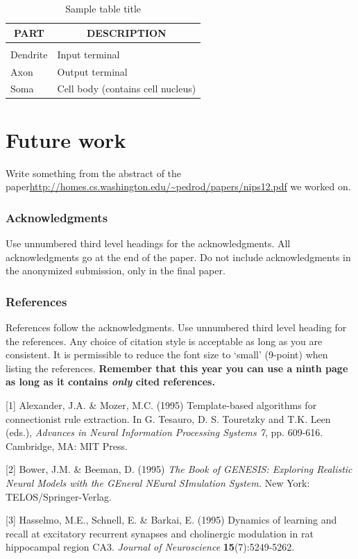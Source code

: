 \documentclass{article} %
\begin{document}
\begin{table}[t]
    \caption{Sample table title}
    \begin{center}
        \begin{tabular}{ll}
        \multicolumn{1}{c}{\bf PART}  &\multicolumn{1}{c}{\bf DESCRIPTION}
        \\ \hline \\
        Dendrite         &Input terminal \\
        Axon             &Output terminal \\
        Soma             &Cell body (contains cell nucleus) \\
        \end{tabular}
    \end{center}
\end{table}

\section{Future work}
    Write something from the abstract of the paper\url{http://homes.cs.washington.edu/~pedrod/papers/nips12.pdf} we worked on.

\subsubsection*{Acknowledgments}

Use unnumbered third level headings for the acknowledgments. All
acknowledgments go at the end of the paper. Do not include 
acknowledgments in the anonymized submission, only in the 
final paper. 

\subsubsection*{References}

References follow the acknowledgments. Use unnumbered third level heading for
the references. Any choice of citation style is acceptable as long as you are
consistent. It is permissible to reduce the font size to `small' (9-point) 
when listing the references. {\bf Remember that this year you can use
a ninth page as long as it contains \emph{only} cited references.}

\small{
[1] Alexander, J.A. \& Mozer, M.C. (1995) Template-based algorithms
for connectionist rule extraction. In G. Tesauro, D. S. Touretzky
and T.K. Leen (eds.), {\it Advances in Neural Information Processing
Systems 7}, pp. 609-616. Cambridge, MA: MIT Press.

[2] Bower, J.M. \& Beeman, D. (1995) {\it The Book of GENESIS: Exploring
Realistic Neural Models with the GEneral NEural SImulation System.}
New York: TELOS/Springer-Verlag.

[3] Hasselmo, M.E., Schnell, E. \& Barkai, E. (1995) Dynamics of learning
and recall at excitatory recurrent synapses and cholinergic modulation
in rat hippocampal region CA3. {\it Journal of Neuroscience}
{\bf 15}(7):5249-5262.
}
\end{document}
